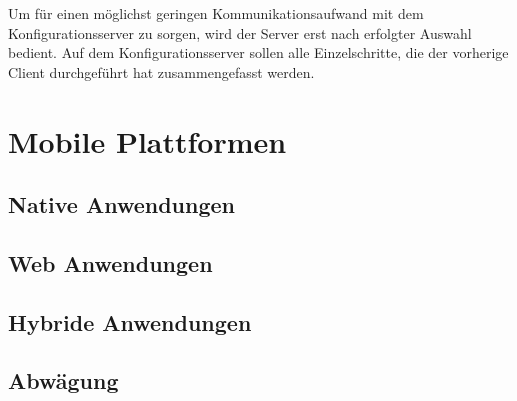 Um für einen möglichst geringen Kommunikationsaufwand mit dem Konfigurationsserver zu sorgen, wird der Server erst nach erfolgter Auswahl bedient. Auf dem Konfigurationsserver sollen alle Einzelschritte, die der vorherige Client durchgeführt hat zusammengefasst werden. 

  


\section{Mobile Plattformen}
\subsection{Native Anwendungen}
\subsection{Web Anwendungen}
\subsection{Hybride Anwendungen}
\subsection{Abwägung}

